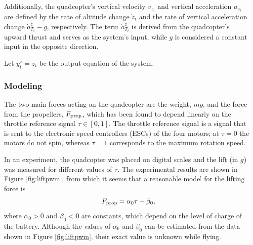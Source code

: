 \documentclass{article}
\begin{document}
Additionally, the quadcopter's vertical velocity \( v_{z_t} \) and vertical
acceleration \( a_{z_t} \) are defined by the rate of altitude change \(
\dot{z}_t \) and the rate of vertical acceleration change \( \dot{a}^z_{T_t} - g
\), respectively. The term \( \dot{a}^z_{T_t} \) is derived from the
quadcopter's upward thrust and serves as the system's input, while \( g \) is
considered a constant input in the opposite direction.

Let \( y_{t}^z = z_t \) be the output equation of the system. 
\subsubsection*{Modeling}
  The two main forces acting on the quadcopter are the weight, $mg$, and the
  force from the propellers, $F_{\rm prop}$, which has been found to depend
  linearly on the throttle reference signal $\tau\in[0,1]$. The throttle
  reference signal is a signal that is sent to the electronic speed controllers
  (ESCs) of the four motors; at $\tau=0$ the motors do not spin, whereas
  $\tau=1$ corresponds to the maximum rotation speed.
  
  In an experiment, the quadcopter was placed on digital scales and the lift (in
  $\unit{g}$) was measured for different values of $\tau$. The experimental
  results are shown in Figure \ref{fig:liftpwm}, from which it seems that a
  reasonable model for the lifting force is
  \begin{equation}
    F_{\rm prop} = \alpha_0 \tau + \beta_0,
    \label{eq:Fprop}
  \end{equation}
  where $\alpha_0>0$ and $\beta_0<0$ are constants, which depend on the level of
  charge of the battery. Although the values of $\alpha_0$ and $\beta_0$ can be
  estimated from the data shown in Figure \ref{fig:liftpwm}, their exact value
  is unknown while flying.
  
\end{document}
